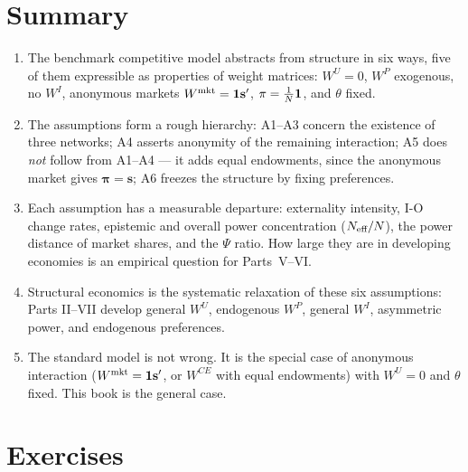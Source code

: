 \documentclass[../structural_economics_book.tex]{subfiles}
\begin{document}
\section{Summary}
\label{ch04:sec:summary}

\begin{enumerate}
\item The benchmark competitive model abstracts from structure in six ways, five of them expressible as properties of weight matrices: $W^U = 0$, $W^P$ exogenous, no $W^I$, anonymous markets $W^{\text{mkt}} = \mathbf{1}\mathbf{s}'$, $\pi = \frac{1}{N}\mathbf{1}$, and $\theta$ fixed.

\item The assumptions form a rough hierarchy: A1--A3 concern the existence of three networks; A4 asserts anonymity of the remaining interaction; A5 does \textit{not} follow from A1--A4 --- it adds equal endowments, since the anonymous market gives $\boldsymbol{\pi} = \mathbf{s}$; A6 freezes the structure by fixing preferences.

\item Each assumption has a measurable departure: externality intensity, I-O change rates, epistemic and overall power concentration ($N_{\text{eff}}/N$), the power distance of market shares, and the $\Psi$ ratio. How large they are in developing economies is an empirical question for Parts~V--VI.

\item Structural economics is the systematic relaxation of these six assumptions: Parts II--VII develop general $W^U$, endogenous $W^P$, general $W^I$, asymmetric power, and endogenous preferences.

\item The standard model is not wrong. It is the special case of anonymous interaction ($W^{\text{mkt}} = \mathbf{1}\mathbf{s}'$, or $W^{CE}$ with equal endowments) with $W^U = 0$ and $\theta$ fixed. This book is the general case.
\end{enumerate}


\section{Exercises}
\label{ch04:sec:exercises}
\end{document}
